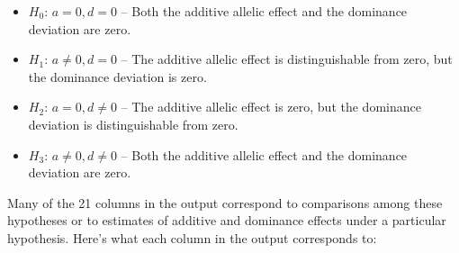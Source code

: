 \documentclass[12pt]{article}
\begin{document}
\begin{itemize}

\item $H_0$: $a=0, d=0$ -- Both the additive allelic effect and the
  dominance deviation are zero.

\item $H_1$: $a \ne 0, d=0$ -- The additive allelic effect is
  distinguishable from zero, but the dominance deviation is zero.

\item $H_2$: $a=0, d \ne 0$ -- The additive allelic effect is zero,
  but the dominance deviation is distinguishable from zero. 

\item $H_3$: $a \ne 0, d \ne 0$ -- Both the additive allelic effect
  and the dominance deviation are zero.

\end{itemize}

\noindent Many of the 21 columns in the output correspond to
comparisons among these hypotheses or to estimates of additive and
dominance effects under a particular hypothesis. Here's what each
column in the output corresponds to:
\end{document}
